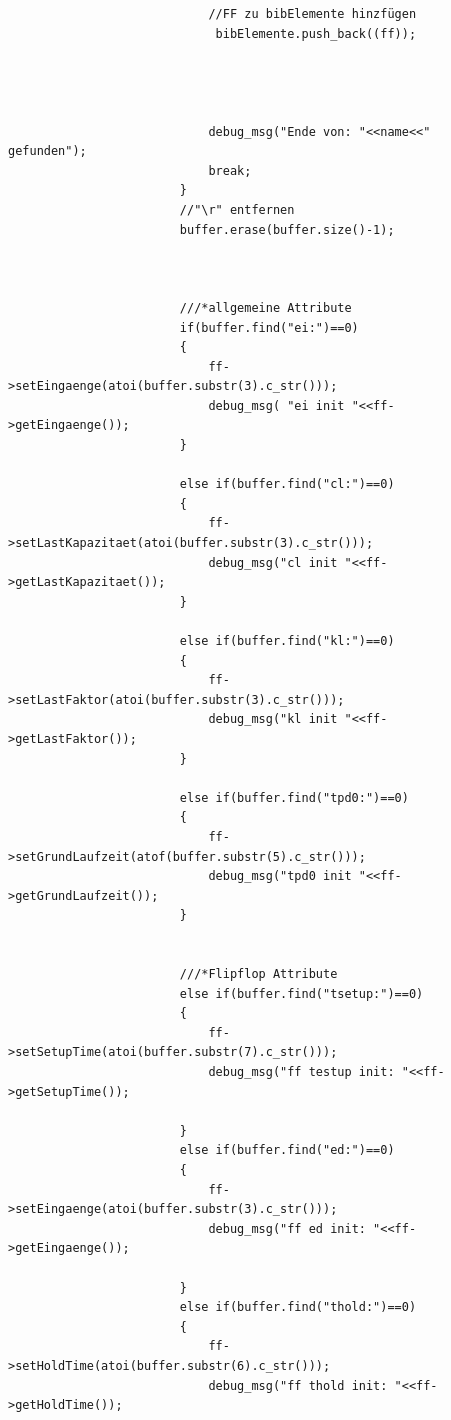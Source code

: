 \documentclass[a4paper,10pt,twoside]{report}
\begin{document}
\begin{lstlisting}
                            //FF zu bibElemente hinzfügen
                             bibElemente.push_back((ff));




                            debug_msg("Ende von: "<<name<<" gefunden");
                            break;
                        }
                        //"\r" entfernen
                        buffer.erase(buffer.size()-1);



                        ///*allgemeine Attribute
                        if(buffer.find("ei:")==0)
                        {
                            ff->setEingaenge(atoi(buffer.substr(3).c_str()));
                            debug_msg( "ei init "<<ff->getEingaenge());
                        }

                        else if(buffer.find("cl:")==0)
                        {
                            ff->setLastKapazitaet(atoi(buffer.substr(3).c_str()));
                            debug_msg("cl init "<<ff->getLastKapazitaet());
                        }

                        else if(buffer.find("kl:")==0)
                        {
                            ff->setLastFaktor(atoi(buffer.substr(3).c_str()));
                            debug_msg("kl init "<<ff->getLastFaktor());
                        }

                        else if(buffer.find("tpd0:")==0)
                        {
                            ff->setGrundLaufzeit(atof(buffer.substr(5).c_str()));
                            debug_msg("tpd0 init "<<ff->getGrundLaufzeit());
                        }


                        ///*Flipflop Attribute
                        else if(buffer.find("tsetup:")==0)
                        {
                            ff->setSetupTime(atoi(buffer.substr(7).c_str()));
                            debug_msg("ff testup init: "<<ff->getSetupTime());

                        }
                        else if(buffer.find("ed:")==0)
                        {
                            ff->setEingaenge(atoi(buffer.substr(3).c_str()));
                            debug_msg("ff ed init: "<<ff->getEingaenge());

                        }
                        else if(buffer.find("thold:")==0)
                        {
                            ff->setHoldTime(atoi(buffer.substr(6).c_str()));
                            debug_msg("ff thold init: "<<ff->getHoldTime());


\end{lstlisting}
\end{document}
